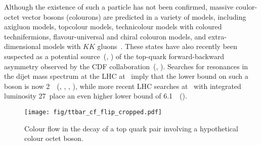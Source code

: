 Although the existence of such a particle has not been confirmed, massive coulor-octet vector bosons (colourons) are predicted in a variety of models, including axigluon models, topcolour models, technicolour models with coloured technifermions, flavour-universal and chiral colouron models, and extra-dimensional models with $KK$ gluons~\cite{Chivukula:2013xla}. These states have also recently been suspected as a potential source~(\cite{Ferrario:2009bz}, \cite{Frampton:2009rk}) of the top-quark forward-backward asymmetry observed by the CDF collaboration~(\cite{Aaltonen:2008hc}, \cite{Aaltonen:2011kc}). Searches for resonances in the dijet mass spectrum at the LHC at ~\TeV imply that the lower bound on such a boson is now 2~\TeV~(\cite{Han:2010rf}, \cite{Haisch:2011up}, \cite{Chatrchyan:2011ns}, \cite{Aad:2011fq}), while more recent LHC searches at ~\TeV with integrated luminosity 27~\fbinv place an even higher lower bound of 6.1~\TeV~(\cite{CMS:2017xrr}).
  
  \begin{figure}[h!]
  \centering
  \texttt{[image: fig/ttbar\_cf\_flip\_cropped.pdf]}
  \caption{Colour flow in the decay of a top quark pair involving a hypothetical colour octet \PW boson.}
  \label{fig:ttbar_cf_octet}
\end{figure}


